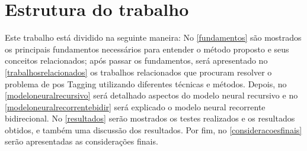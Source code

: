 


\section{Estrutura do trabalho}\label{sec:estruturadotrabalho}

Este trabalho está dividido na seguinte maneira: No \autoref{fundamentos} são mostrados os principais fundamentos necessários para entender o método proposto e seus conceitos relacionados; após passar os fundamentos, será apresentado no \autoref{trabalhosrelacionados} os trabalhos relacionados que procuram resolver o problema de \ac{pos} Tagging utilizando diferentes técnicas e métodos. Depois, no \autoref{modeloneuralrecursivo} será detalhado aspectos do modelo neural recursivo e no \autoref{modeloneuralrecorrentebidir} será explicado o modelo neural recorrente bidirecional. No \autoref{resultados} serão mostrados os testes realizados e os resultados obtidos, e também uma discussão dos resultados. Por fim, no \autoref{consideracoesfinais} serão apresentadas as considerações finais.

